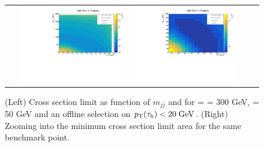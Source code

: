 \begin{figure}[tbh!]
	\centering
	\begin{tabular}{cc}
		\includegraphics[width=0.45\textwidth]{analysis/pics/JetInvMass_vs_MET_xsec_chi300_lsp050_taupt20.pdf}
		\includegraphics[width=0.45\textwidth]{analysis/pics/JetInvMass_vs_MET_xsec_chi300_lsp050_taupt20_zoom.pdf} 		
	\end{tabular}
	\caption{(Left) Cross section limit as function of $m_{jj}$ and \met for \charginopm = \neutralinotwo = 300 GeV, \neutralinoone = 50 GeV and an offline selection on $p_{\text{T}}(\tau_{\text{h}}) <  20\;\text{Ge}\kern-0.06667em\text{V}$. (Right) Zooming into the minimum cross section limit area for the same benchmark point.}
	\label{fig::JetInvMass_vs_MET_xsec_chi300_lsp050_taupt20}
\end{figure}

